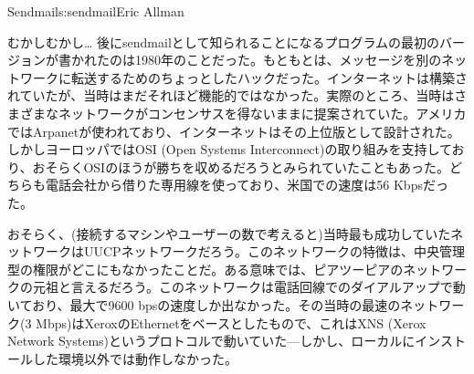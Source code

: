 \begin{aosachapter}{Sendmail}{s:sendmail}{Eric Allman}
\begin{aosasect1}{むかしむかし\ldots}
後にsendmailとして知られることになるプログラムの最初のバージョンが書かれたのは1980年のことだった。もともとは、メッセージを別のネットワークに転送するためのちょっとしたハックだった。インターネットは構築されていたが、当時はまだそれほど機能的ではなかった。実際のところ、当時はさまざまなネットワークがコンセンサスを得ないままに提案されていた。アメリカではArpanetが使われており、インターネットはその上位版として設計された。しかしヨーロッパではOSI (Open Systems Interconnect)の取り組みを支持しており、おそらくOSIのほうが勝ちを収めるだろうとみられていたこともあった。どちらも電話会社から借りた専用線を使っており、米国での速度は56 Kbpsだった。

おそらく、(接続するマシンやユーザーの数で考えると)当時最も成功していたネットワークはUUCPネットワークだろう。このネットワークの特徴は、中央管理型の権限がどこにもなかったことだ。ある意味では、ピアツーピアのネットワークの元祖と言えるだろう。このネットワークは電話回線でのダイアルアップで動いており、最大で9600 bpsの速度しか出なかった。その当時の最速のネットワーク(3 Mbps)はXeroxのEthernetをベースとしたもので、これはXNS (Xerox Network Systems)というプロトコルで動いていた---しかし、ローカルにインストールした環境以外では動作しなかった。


\end{aosasect1}
\end{aosachapter}
